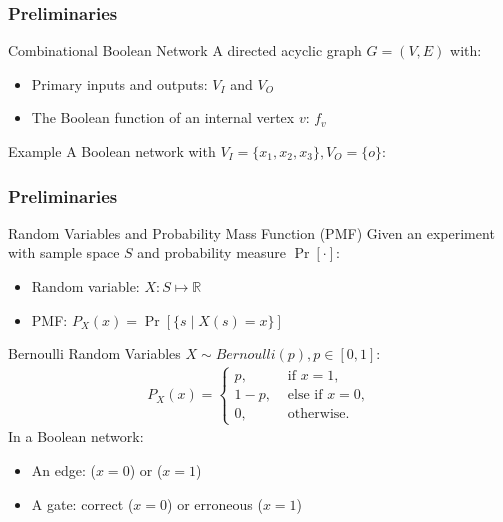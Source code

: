 \begin{frame}
  \frametitle{Preliminaries}
  \begin{block}{Combinational Boolean Network}
    A directed acyclic graph $G=(V,E)$ with:
    \pause
    \begin{itemize}
      \item Primary inputs and outputs: $V_I$ and $V_O$
            \pause
      \item The Boolean function of an internal vertex $v$: $f_v$
            \pause
    \end{itemize}
  \end{block}
  \begin{block}{Example}
    A Boolean network with $V_I=\{x_1,x_2,x_3\},V_O=\{o\}$:
    \begin{figure}
      \centering
      
    \end{figure}
  \end{block}
\end{frame}

\begin{frame}
  \frametitle{Preliminaries}
  \begin{block}{Random Variables and Probability Mass Function (PMF)}
    Given an experiment with sample space $S$ and probability measure $\Pr[\cdot]$:
    \pause
    \begin{itemize}
      \item Random variable: $X:S\mapsto\mathbb{R}$
            \pause
      \item PMF: $P_X(x)=\Pr[\{s \mid X(s)=x\}]$
    \end{itemize}
  \end{block}
  \pause
  \begin{block}{Bernoulli Random Variables}
    $X\sim\textit{Bernoulli}(p),p\in[0,1]$:
    \pause
    \begin{align*}
      P_X(x)=
      \left\{
      \begin{array}{ll}
        p,   & \mbox{ if } x = 1,      \\
        1-p, & \mbox{ else if } x = 0, \\
        0,   & \mbox{ otherwise. }
      \end{array}
      \right.
    \end{align*}
    \pause
    In a Boolean network:
    \pause
    \begin{itemize}
      \item An edge: \false ($x=0$) or \true ($x=1$)
            \pause
      \item A gate: correct ($x=0$) or erroneous ($x=1$)
    \end{itemize}
  \end{block}
\end{frame}
